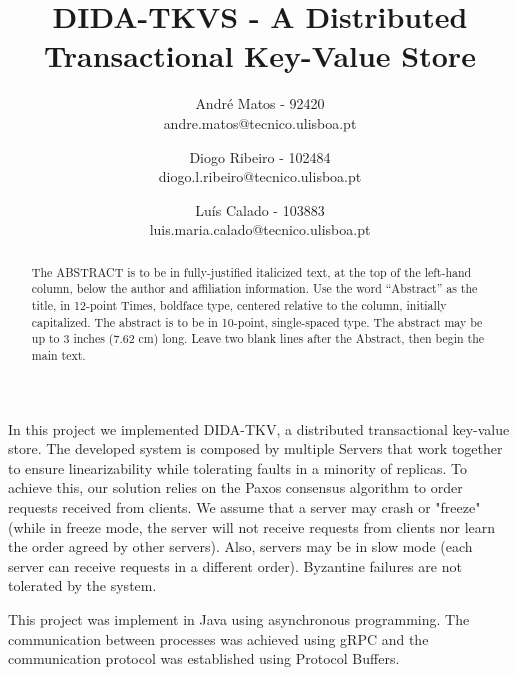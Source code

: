 \documentclass[times, 10pt,twocolumn]{article}
\begin{document}
\title{DIDA-TKVS - A Distributed Transactional Key-Value Store}

\author{André Matos - 92420\\
andre.matos@tecnico.ulisboa.pt\\
\and
Diogo Ribeiro - 102484\\
diogo.l.ribeiro@tecnico.ulisboa.pt\\
\and
Luís Calado - 103883\\
luis.maria.calado@tecnico.ulisboa.pt\\
}

\maketitle
\thispagestyle{empty}

\begin{abstract}
   The ABSTRACT is to be in fully-justified italicized text, at the top 
   of the left-hand column, below the author and affiliation 
   information. Use the word ``Abstract'' as the title, in 12-point 
   Times, boldface type, centered relative to the column, initially 
   capitalized. The abstract is to be in 10-point, single-spaced type. 
   The abstract may be up to 3 inches (7.62 cm) long. Leave two blank 
   lines after the Abstract, then begin the main text. 
\end{abstract}




In this project we implemented DIDA-TKV, a distributed
transactional key-value store. The developed system is
composed by multiple Servers that work together to ensure
linearizability while tolerating faults in a minority of
replicas. To achieve this, our solution relies on the Paxos
consensus algorithm to order requests received from clients.
We assume that a server may crash or "freeze" (while in freeze mode, the
server will not receive requests from clients nor learn the order
agreed by other servers). Also, servers may be in slow mode
(each server can receive requests in a different order).
Byzantine failures are not tolerated by the system.

This project was implement in Java using asynchronous
programming. The communication between processes was
achieved using gRPC and the communication protocol was
established using Protocol Buffers.

\end{document}
